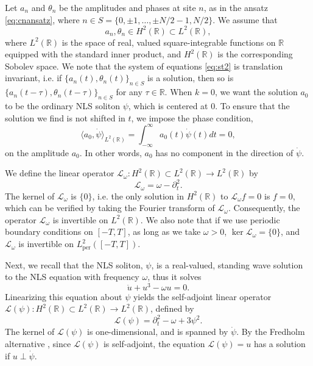 \documentclass[11pt,reqno]{amsart}
\def\R{{\mathbb R}}
\def\calL{{\mathcal L}}
\def\Lw{{\mathcal{L}_\omega}}
\begin{document}
Let $a_n$ and $\theta_n$ be the amplitudes and phases at site $n$, as in the ansatz \cref{eq:cnansatz}, where $n \in S = \{ 0, \pm 1, \dots, \pm N/2-1, N/2 \}$. We assume that 
\[
a_n, \theta_n \in H^2(\R) \subset L^2(\R),
\]
where $L^2(\R)$ is the space of real, valued square-integrable functions on $\R$ equipped with the standard inner product, and $H^2(\R)$ is the corresponding Sobolev space. We note that the system of equations \cref{eq:st2} is translation invariant, i.e. if $\{ a_n(t), \theta_n(t)\}_{n\in S}$ is a solution, then so is $\{ a_n(t-\tau), \theta_n(t-\tau)\}_{n\in S}$ for any $\tau \in \R$. When $k = 0$, we want the solution $a_0$ to be the ordinary NLS soliton $\psi$, which is centered at 0. To ensure that the solution we find is not shifted in $t$, we impose the phase condition,
\begin{equation}\label{eq:phasecond}
\langle a_0, \dot{\psi} \rangle_{L^2(\R)} = \int_{-\infty}^\infty a_0(t) \dot{\psi}(t) dt = 0,
\end{equation}
on the amplitude $a_0$. In other words, $a_0$ has no component in the direction of $\dot{\psi}$.

We define the linear operator $\Lw: H^2(\R) \subset L^2(\R) \rightarrow L^2(\R)$ by
\begin{equation}\label{eq:Lw}
\Lw = \omega - \partial_t^2.
\end{equation}
The kernel of $\Lw$ is $\{0\}$, i.e. the only solution in $H^2(\R)$ to $\Lw f = 0$ is $f = 0$, which can be verified by taking the Fourier transform of $\Lw$. Consequently, the operator $\Lw$ is invertible on $L^2(\R)$. We also note that if we use periodic boundary conditions on $[-T,T]$, as long as we take $\omega > 0$, $\ker \Lw = \{0\}$, and $\Lw$ is invertible on $L^2_{\text{per}}([-T,T])$.

Next, we recall that the NLS soliton, $\psi$, is a real-valued, standing wave solution to the NLS equation with frequency $\omega$, thus it solves 
\begin{equation}\label{eq:NLSreal}
\ddot{u} + u^3 - \omega u = 0. 
\end{equation}
Linearizing this equation about $\psi$ yields the self-adjoint linear operator $\calL(\psi): H^2(\R) \subset L^2(\R) \rightarrow L^2(\R)$, defined by
\begin{equation}\label{eq:Lpsi}
\calL(\psi) = \partial_t^2 - \omega + 3 \psi^2.
\end{equation}
The kernel of $\calL(\psi)$ is one-dimensional, and is spanned by $\dot{\psi}$. By the Fredholm alternative \cite{Ramm2001}, since $\calL(\psi)$ is self-adjoint, the equation $\calL(\psi) = u$ has a solution if $u \perp \dot{\psi}$.
\end{document}
